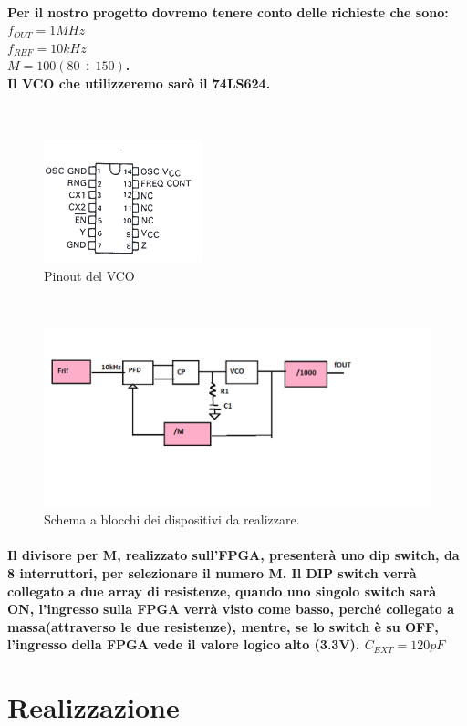 \documentclass{article}
\begin{document}
\paragraph{Per il nostro progetto dovremo tenere conto delle richieste che sono:$f_{OUT}=1 MHz$\\$f_{REF}=10 kHz$\\$M=100 (80\div150)$.\\Il VCO che utilizzeremo sarò il 74LS624.}
~\begin{figure}[!h]%
\includegraphics[scale=1]{74LS.png} 
\centering
\caption{Pinout del VCO}
\label{fig:foo}
\end{figure}
~\begin{figure}[!h]%
\includegraphics[scale=0.4]{SCH.png} 
\centering
\caption{Schema a blocchi dei dispositivi da realizzare.}
\label{fig:foo}
\end{figure}
\paragraph{Il divisore per M, realizzato sull'FPGA, presenterà uno dip switch, da 8 interruttori, per selezionare il numero M. Il DIP switch verrà collegato a due array di resistenze, quando uno singolo switch sarà ON, l'ingresso sulla FPGA verrà visto come basso, perché collegato a massa(attraverso le due resistenze), mentre, se lo switch è su OFF, l'ingresso della FPGA vede il valore logico alto (3.3V).
$C_{EXT}=120pF$}
\newpage
\section{Realizzazione}
\end{document}
